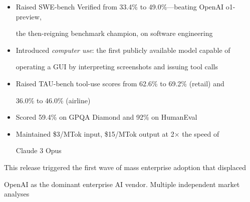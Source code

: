 \documentclass[11pt]{article}
\theoremstyle{definition}
\begin{document}
\begin{itemize}





  \item Raised SWE-bench Verified from 33.4\% to 49.0\%---beating OpenAI o1-preview,





    the then-reigning benchmark champion, on software engineering





  \item Introduced \emph{computer use}: the first publicly available model capable of





    operating a GUI by interpreting screenshots and issuing tool calls





  \item Raised TAU-bench tool-use scores from 62.6\% to 69.2\% (retail) and





    36.0\% to 46.0\% (airline)





  \item Scored 59.4\% on GPQA Diamond and 92\% on HumanEval





  \item Maintained \$3/MTok input, \$15/MTok output at 2$\times$ the speed of





    Claude 3 Opus





\end{itemize}











This release triggered the first wave of mass enterprise adoption that displaced





OpenAI as the dominant enterprise AI vendor. Multiple independent market analyses
\end{document}

